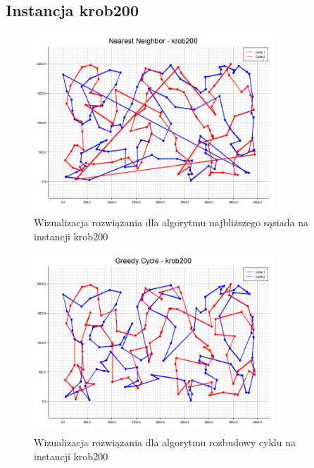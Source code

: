 \documentclass[12pt,a4paper]{article}
\begin{document}
\subsection{Instancja krob200}

\begin{figure}[H]
\centering
\includegraphics[width=0.8\textwidth]{figures/krob200_Nearest_Neighbor.png}
\caption{Wizualizacja rozwiązania dla algorytmu najbliższego sąsiada na instancji krob200}
\end{figure}

\begin{figure}[H]
\centering
\includegraphics[width=0.8\textwidth]{figures/krob200_Greedy_Cycle.png}
\caption{Wizualizacja rozwiązania dla algorytmu rozbudowy cyklu na instancji krob200}
\end{figure}
\end{document}
